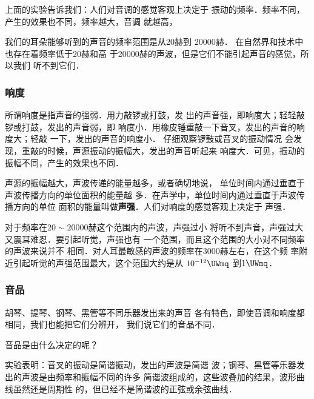 上面的实验告诉我们：人们对音调的感觉客观上决定于
振动的频率．频率不同，产生的效果也不同，频率越大，音调
就越高，

我们的耳朵能够听到的声音的频率范围是从20赫到
20000赫．
在自然界和技术中也存在着频率低于20赫和高
于20000赫的声波，但是它们不能引起声音的感觉，所以我们
听不到它们．


\subsubsection{响度}
所谓响度是指声音的强弱．用力敲锣或打鼓，发
出的声音强，即响度大；轻轻敲锣或打鼓，发出的声音弱，即
响度小．用橡皮锤重敲一下音叉，发出的声音的响度大；轻敲
一下，发出的声音的响度小．
仔细观察锣鼓或音叉的振动情况
会发现，重敲的时候，声源振动的振幅大，发出的声音听起来
响度大．可见，振动的振幅不同，产生的效果也不同．

声源的振幅越大，声波传递的能量越多，或者确切地说，
单位时间内通过垂直于声波传播方向的单位面积的能量越
多．在声学中，单位时间内通过垂直于声波传播方向的单位
面积的能量叫做\textbf{声强}．人们对响度的感觉客观上决定于
声强．

对于频率在$20 \sim 20000$赫这个范围内的声波，声强过小
将听不到声音，声强过大又震耳难忍．要引起听觉，声强也有
一个范围，而且这个范围的大小对不同频率的声波来说并不
相同．对人耳最敏感的声波的频率在3000赫左右，在这个频
率附近引起听觉的声强范围最大，这个范围大约是从
$10^{-12} \UWmq $
到$1 \UWmq$．

\subsubsection{音品}

胡琴、提琴、钢琴、黑管等不同乐器发出来的声音
各有特色，即使音调和响度都相同，我们也能把它们分辨开，
我们说它们的音品不同．

音品是由什么决定的呢？

实验表明：音叉的振动是简谐振动，发出的声波是简谐
波；钢琴、黑管等乐器发出的声波是由频率和振幅不同的许多
简谐波组成的，这些波叠加的结果，波形曲线虽然还是周期性
的，但已经不是简谐波的正弦或余弦曲线．

